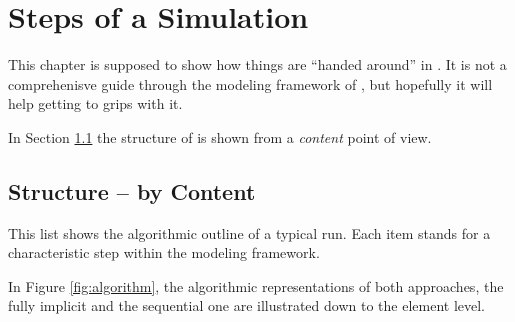 \section{Steps of a \Dumux Simulation}
\label{flow}


This chapter is supposed to show how things are ``handed around'' in \Dumux. It
is not a comprehenisve guide through the modeling framework of \Dumux, but
hopefully it will help getting to grips with it.

In Section \ref{content} the structure of \Dumux is shown from a \emph{content}
point of view.

\subsection{Structure -- by Content}

\label{content}
This list shows the algorithmic outline of a typical \Dumux run. Each item stands
for a characteristic step within the modeling framework.

In Figure \ref{fig:algorithm}, the algorithmic representations of both approaches, the fully 
implicit and the sequential one are illustrated down to the element level.

